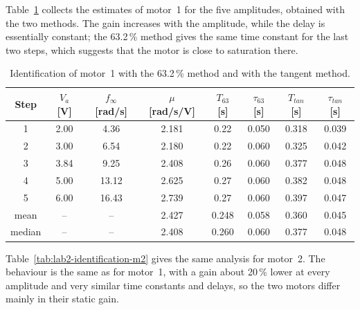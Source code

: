 \documentclass[english]{article}
\begin{document}
\noindent Table~\ref{tab:lab2-identification} collects the estimates of motor~1 for the five amplitudes, obtained with
the two methods. The gain increases with the amplitude, while the delay is essentially constant; the 63.2\,\% method
gives the same time constant for the last two steps, which suggests that the motor is close to saturation there.

\begin{table}[H]
  \centering
  \small
  \begin{tabular}{@{}cccccccc@{}}
    \toprule
    Step   & $V_a$ [V] & $f_\infty$ [rad/s] & $\mu$ [rad/s/V] & $T_{63}$ [s] & $\tau_{63}$ [s] & $T_{tan}$ [s] & $\tau_{tan}$ [s] \\
    \midrule
    1      & 2.00      & 4.36               & 2.181           & 0.22         & 0.050           & 0.318         & 0.039            \\
    2      & 3.00      & 6.54               & 2.180           & 0.22         & 0.060           & 0.325         & 0.042            \\
    3      & 3.84      & 9.25               & 2.408           & 0.26         & 0.060           & 0.377         & 0.048            \\
    4      & 5.00      & 13.12              & 2.625           & 0.27         & 0.060           & 0.382         & 0.048            \\
    5      & 6.00      & 16.43              & 2.739           & 0.27         & 0.060           & 0.397         & 0.047            \\
    \midrule
    mean   & --        & --                 & 2.427           & 0.248        & 0.058           & 0.360         & 0.045            \\
    median & --        & --                 & 2.408           & 0.260        & 0.060           & 0.377         & 0.048            \\
    \bottomrule
  \end{tabular}
  \caption{Identification of motor~1 with the 63.2\,\% method and with the tangent method.}
  \label{tab:lab2-identification}
\end{table}

\noindent Table~\ref{tab:lab2-identification-m2} gives the same analysis for motor~2. The behaviour is the same as for
motor~1, with a gain about 20\,\% lower at every amplitude and very similar time constants and delays, so the two
motors differ mainly in their static gain.
\end{document}
